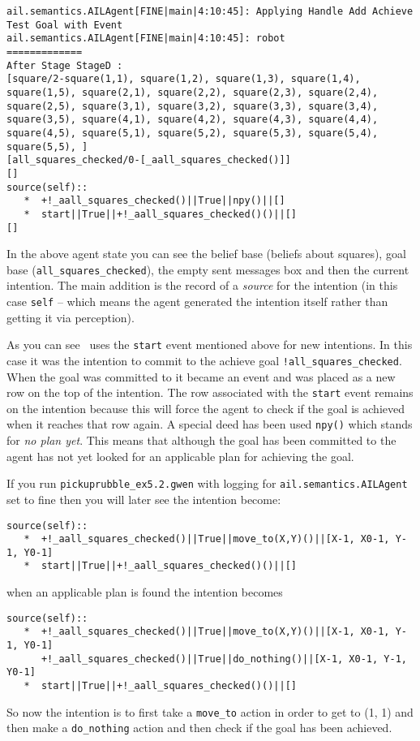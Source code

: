 \documentclass[a4]{article}
\begin{document}
\begin{verbatim}
ail.semantics.AILAgent[FINE|main|4:10:45]: Applying Handle Add Achieve Test Goal with Event 
ail.semantics.AILAgent[FINE|main|4:10:45]: robot
=============
After Stage StageD :
[square/2-square(1,1), square(1,2), square(1,3), square(1,4), square(1,5), square(2,1), square(2,2), square(2,3), square(2,4), square(2,5), square(3,1), square(3,2), square(3,3), square(3,4), square(3,5), square(4,1), square(4,2), square(4,3), square(4,4), square(4,5), square(5,1), square(5,2), square(5,3), square(5,4), square(5,5), ]
[all_squares_checked/0-[_aall_squares_checked()]]
[]
source(self):: 
   *  +!_aall_squares_checked()||True||npy()||[]
   *  start||True||+!_aall_squares_checked()()||[]
[] 
\end{verbatim}
In the above agent state you can see the belief base (beliefs about squares), goal base (\texttt{all\_squares\_checked}), the empty sent messages box and then the current intention.  The main addition is the record of a \emph{source} for the intention (in this case \texttt{self} -- which means the agent generated the intention itself rather than getting it via perception).

As you can see \gwendolen\ uses the \texttt{start} event mentioned above for new intentions.  In this case it was the intention to commit to the achieve goal \lstinline{!all_squares_checked}.  When the goal was committed to it became an event and was placed as a new row on the top of the intention.  The row associated with the \texttt{start} event remains on the intention because this will force the agent to check if the goal is achieved when it reaches that row again.  A special deed has been used \texttt{npy()} which stands for \emph{no plan yet}.  This means that although the goal has been committed to the agent has not yet looked for an applicable plan for achieving the goal.

If you run \texttt{pickuprubble\_ex5.2.gwen} with logging for \texttt{ail.semantics.AILAgent} set to fine then you will later see the intention become:
\begin{verbatim}
source(self):: 
   *  +!_aall_squares_checked()||True||move_to(X,Y)()||[X-1, X0-1, Y-1, Y0-1]
   *  start||True||+!_aall_squares_checked()()||[]
\end{verbatim}
when an applicable plan is found the intention becomes

\begin{verbatim}
source(self):: 
   *  +!_aall_squares_checked()||True||move_to(X,Y)()||[X-1, X0-1, Y-1, Y0-1]
      +!_aall_squares_checked()||True||do_nothing()||[X-1, X0-1, Y-1, Y0-1]
   *  start||True||+!_aall_squares_checked()()||[]
\end{verbatim}
So now the intention is to first take a \texttt{move\_to} action in order to get to (1, 1) and then make a \texttt{do\_nothing} action and then check if the goal has been achieved.
\end{document}
